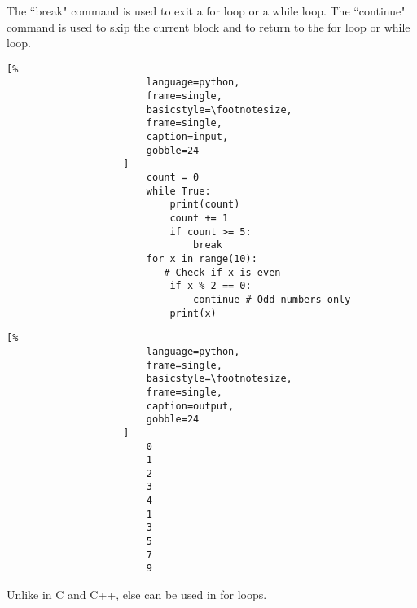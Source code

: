 \documentclass[crop=false,class=book]{standalone}
\begin{document}
                The ``break" command is used to exit a for loop or a
                while loop. The ``continue" command is used to skip
                the current block and to return to the for loop or
                while loop.
                \newpage
                \begin{minipage}[t]{.48\textwidth}
                    \centering
                    \begin{lstlisting}[%
                        language=python,
                        frame=single,
                        basicstyle=\footnotesize,
                        frame=single,
                        caption=input,
                        gobble=24
                    ]
                        count = 0
                        while True:
                            print(count)
                            count += 1
                            if count >= 5:
                                break
                        for x in range(10):
                           # Check if x is even
                            if x % 2 == 0:
                                continue # Odd numbers only
                            print(x)
                    \end{lstlisting}
                \end{minipage}\hfill
                \begin{minipage}[t]{.48\textwidth}
                    \centering
                    \begin{lstlisting}[%
                        language=python,
                        frame=single,
                        basicstyle=\footnotesize,
                        frame=single,
                        caption=output,
                        gobble=24
                    ]
                        0
                        1
                        2
                        3
                        4
                        1
                        3
                        5
                        7
                        9
                    \end{lstlisting}
                \end{minipage}
                Unlike in C and C++, else can be used in for
                loops.\newline
\end{document}
